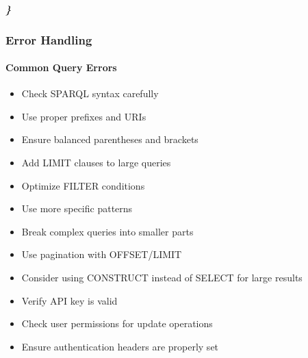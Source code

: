 \documentclass[letterpaper,10pt,english]{sphinxmanual}
\begin{document}
\subparagraph{\}}
\label{\detokenize{api/sparql-api:id146}}

\subsubsection{Error Handling}
\label{\detokenize{api/sparql-api:error-handling}}

\paragraph{Common Query Errors}
\label{\detokenize{api/sparql-api:common-query-errors}}\begin{description}
\begin{itemize}
\item {} 
\sphinxAtStartPar
Check SPARQL syntax carefully

\item {} 
\sphinxAtStartPar
Use proper prefixes and URIs

\item {} 
\sphinxAtStartPar
Ensure balanced parentheses and brackets

\end{itemize}

\begin{itemize}
\item {} 
\sphinxAtStartPar
Add LIMIT clauses to large queries

\item {} 
\sphinxAtStartPar
Optimize FILTER conditions

\item {} 
\sphinxAtStartPar
Use more specific patterns

\end{itemize}

\begin{itemize}
\item {} 
\sphinxAtStartPar
Break complex queries into smaller parts

\item {} 
\sphinxAtStartPar
Use pagination with OFFSET/LIMIT

\item {} 
\sphinxAtStartPar
Consider using CONSTRUCT instead of SELECT for large results

\end{itemize}

\begin{itemize}
\item {} 
\sphinxAtStartPar
Verify API key is valid

\item {} 
\sphinxAtStartPar
Check user permissions for update operations

\item {} 
\sphinxAtStartPar
Ensure authentication headers are properly set

\end{itemize}

\end{description}
\end{document}

